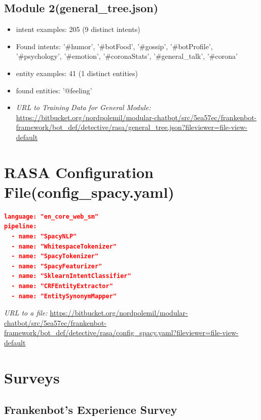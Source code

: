 \begin{appendix}
\subsection{Module 2(general\_tree.json)\label{appen:generalJson}}
\begin{itemize}
    \item intent examples: 205 (9 distinct intents)
	\item Found intents: '\#humor', '\#botFood', '\#gossip', '\#botProfile', '\#psychology', '\#emotion', '\#coronaStats', '\#general\_talk', '\#corona'
	\item entity examples: 41 (1 distinct entities)
	\item found entities: '@feeling'
	\item \textit{URL to Training Data for General Module: }\url{https://bitbucket.org/nordpolemil/modular-chatbot/src/5ea57ec/frankenbot-framework/bot_def/detective/rasa/general\_tree.json?fileviewer=file-view-default}
\end{itemize}
    

\section{RASA Configuration File(config\_spacy.yaml)\label{appen:rasaConf}}
\begin{lstlisting}[language=json, firstnumber=1, caption=RASA Pipeline for Frankenbot., label={lst:rasaPipeline}]
language: "en_core_web_sm"
pipeline:
  - name: "SpacyNLP"
  - name: "WhitespaceTokenizer"
  - name: "SpacyTokenizer"
  - name: "SpacyFeaturizer"
  - name: "SklearnIntentClassifier"
  - name: "CRFEntityExtractor"
  - name: "EntitySynonymMapper"
\end{lstlisting}
\textit{URL to a file: }\url{https://bitbucket.org/nordpolemil/modular-chatbot/src/5ea57ec/frankenbot-framework/bot_def/detective/rasa/config\_spacy.yaml?fileviewer=file-view-default}

\section{Surveys\label{appen:survey}}

\subsection{Frankenbot's Experience Survey\label{appen:expsurvey}}



\end{appendix}
